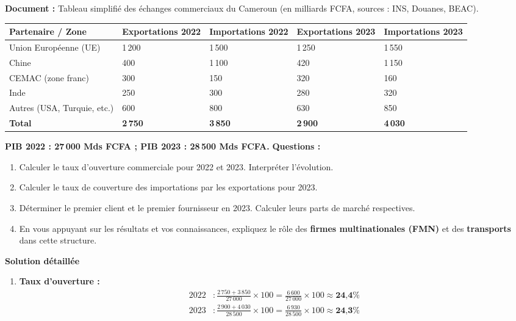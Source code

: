\documentclass[11pt]{article}
\begin{document}
\begin{exoresolu}
\textbf{Document :} Tableau simplifié des échanges commerciaux du Cameroun (en milliards FCFA, sources : INS, Douanes, BEAC).
\begin{center}
\begin{tabularx}{\linewidth}{|l|X|X|X|X|}\hline
\rowcolor{popblueL}
\textbf{Partenaire / Zone} & \textbf{Exportations 2022} & \textbf{Importations 2022} & \textbf{Exportations 2023} & \textbf{Importations 2023} \\ \hline
Union Européenne (UE) & 1\,200 & 1\,500 & 1\,250 & 1\,550 \\ \hline
Chine & 400 & 1\,100 & 420 & 1\,150 \\ \hline
CEMAC (zone franc) & 300 & 150 & 320 & 160 \\ \hline
Inde & 250 & 300 & 280 & 320 \\ \hline
Autres (USA, Turquie, etc.) & 600 & 800 & 630 & 850 \\ \hline
\textbf{Total} & \textbf{2\,750} & \textbf{3\,850} & \textbf{2\,900} & \textbf{4\,030} \\ \hline
\end{tabularx}
\end{center}
\textbf{PIB 2022 : 27\,000 Mds FCFA ; PIB 2023 : 28\,500 Mds FCFA.}
\textbf{Questions :}
\begin{enumerate}
    \item Calculer le taux d'ouverture commerciale pour 2022 et 2023. Interpréter l'évolution.
    \item Calculer le taux de couverture des importations par les exportations pour 2023.
    \item Déterminer le premier client et le premier fournisseur en 2023. Calculer leurs parts de marché respectives.
    \item En vous appuyant sur les résultats et vos connaissances, expliquez le rôle des \textbf{firmes multinationales (FMN)} et des \textbf{transports} dans cette structure.
\end{enumerate}
\tcblower
\textbf{Solution détaillée}
\begin{enumerate}
    \item \textbf{Taux d'ouverture :}
    \begin{align*}
    2022 &: \frac{2\,750 + 3\,850}{27\,000} \times 100 = \frac{6\,600}{27\,000} \times 100 \approx \textbf{24,4\%} \\
    2023 &: \frac{2\,900 + 4\,030}{28\,500} \times 100 = \frac{6\,930}{28\,500} \times 100 \approx \textbf{24,3\%}

\end{align*}
\end{enumerate}
\end{exoresolu}
\end{document}
